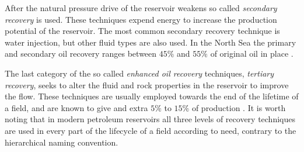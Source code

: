After the natural pressure drive of the reservoir weakens so called \emph{secondary recovery} is used. These techniques expend energy to increase the production potential of the reservoir. The most common secondary recovery technique is water injection, but other fluid types are also used. In the North Sea the primary and secondary oil recovery ranges between $45\%$ and $55 \%$ of original oil in place \citep{green_enhanced_2003}. 

The last category of the so called \emph{enhanced oil recovery} techniques, \emph{tertiary recovery}, seeks to alter the fluid and rock properties in the reservoir to improve the flow. These techniques are usually employed towards the end of the lifetime of a field, and are known to give and extra $5\%$ to $15\%$ of production \citep{tzimas_enhanced_2005}. It is worth noting that in modern petroleum reservoirs all three levels of recovery techniques are used in every part of the lifecycle of a field according to need, contrary to the hierarchical naming convention.

